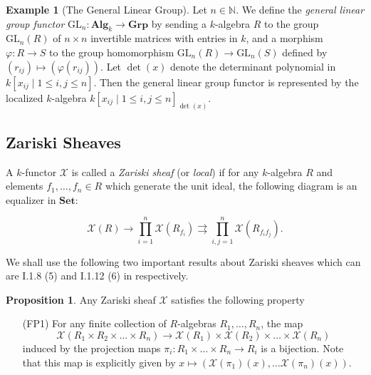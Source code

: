 \documentclass[oneside,11pt]{amsart}
\newcommand{\nn}{\ensuremath{\mathbb{N}}}
\newcommand{\bSet}{\ensuremath{\textbf{Set}}}
\newcommand{\bAlg}{\ensuremath{\textbf{Alg}}}
\newcommand{\bGrp}{\ensuremath{\textbf{Grp}}}
\newcommand{\mX}{\ensuremath{\mathcal{X}}}
\newcommand{\GL}{\ensuremath{\text{GL}}}
\theoremstyle{definition}
\newtheorem{example}{Example}
\newtheorem{proof techniques}{Proof Techniques}
\newtheorem{proposition}{Proposition}
\begin{document}
\begin{example}[The General Linear Group]
Let $n  \in \nn$. We define the \emph{general linear group functor} $\GL_n : \bAlg_k \to \bGrp$ by sending a $k$-algebra $R$ to the group $\GL_n(R)$ of $n \times n$ invertible matrices with entries in $k$, and a morphism $\varphi : R \to S$ to the group homomorphism $\GL_n(R) \to \GL_n(S)$ defined by $(r_{ij}) \mapsto (\varphi(r_{ij}) )$. Let $\det(x)$ denote the determinant polynomial in $k[x_{ij} \mid 1 \leq i,j \leq n]$. Then the general linear group functor is represented by the localized $k$-algebra $k[x_{ij} \mid 1 \leq i,j \leq n]_{\det(x)}$. 
\end{example}



\subsection{Zariski Sheaves}
A $k$-functor $\mX$ is called a \emph{Zariski sheaf} (or \emph{local}) if for any $k$-algebra $R$ and elements $f_1, \ldots, f_n \in R$ which generate the unit ideal, the following diagram is an equalizer in $\bSet$:

\begin{equation*}
\mX( R ) \to \prod_{i = 1}^n \mX(R_{f_i}) \rightrightarrows \prod_{i , j = 1}^n \mX(R_{f_i f_j}).
\end{equation*}

We shall use the following two important results about Zariski sheaves which can are I.1.8 (5) and I.1.12 (6) in \cite{jantzen2003} respectively. 

\begin{proposition}\label{prop: zariski sheaves satisfy fp1}
Any Zariski sheaf $\mX$ satisfies the following property
\begin{itemize}

\item[(FP1)] For any finite collection of $R$-algebras $R_1, \ldots, R_n$, the map 
\begin{equation*}
\mX(R_1 \times R_2 \times \ldots \times R_n) \to \mX(R_1) \times \mX(R_2) \times \ldots \times \mX(R_n)
\end{equation*}
induced by the projection maps $\pi_i : R_1 \times \ldots \times R_n \to R_i$ is a bijection. Note that this map is explicitly given by $x \mapsto ( \mX(\pi_1)(x) ,  \ldots \mX(\pi_n)(x) )$. 

\end{itemize}
\end{proposition}
\end{document}
